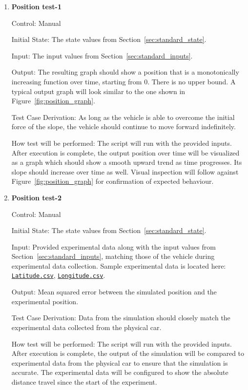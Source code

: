 \documentclass[12pt, titlepage]{article}
\newcommand{\refdata}[2]{
  \href{https://github.com/gr812b/CVT-Simulator/blob/main/experimental-data/#1
  }{\texttt{#2}}}
\begin{document}
\begin{enumerate}
  
  \item {} \hypertarget{PositionTest-1}{\textbf{Position test-1}} \label{PositionTest-1}
  
  Control: Manual
            
  Initial State: The state values from Section~\ref{sec:standard_state}.
  
  Input: The input values from Section~\ref{sec:standard_inputs}.
            
  Output: The resulting graph should show a position that is a monotonically increasing function over time, starting from 0. There is no upper bound. A typical output graph will look similar to the one shown in Figure~\ref{fig:position_graph}.
  
  Test Case Derivation: As long as the vehicle is able to overcome the initial force of the slope, the vehicle should continue to move forward indefinitely.
  
  How test will be performed: The script will run with the provided inputs. After execution is complete, the output position over time will be visualized as a graph which should show a smooth upward trend as time progresses. Its slope should increase over time as well. Visual inspection will follow against Figure~\ref{fig:position_graph} for confirmation of expected behaviour.
  
  \item {} \hypertarget{PositionTest-2}{\textbf{Position test-2}} \label{PositionTest-2}

  Control: Manual

  Initial State: The state values from Section~\ref{sec:standard_state}.
  
  Input: Provided experimental data along with the input values from Section~\ref{sec:standard_inputs}, matching those of the vehicle during experimental data collection. Sample experimental data is located here: \refdata{GPS\%20LATITUDE.csv}{Latitude.csv}, \refdata{GPS\%20LONGITUDE.csv}{Longitude.csv}.

  Output: Mean squared error between the simulated position and the experimental position.

  Test Case Derivation: Data from the simulation should closely match the experimental data collected from the physical car.

  How test will be performed: The script will run with the provided inputs. After execution is complete, the output of the simulation will be compared to experimental data from the physical car to ensure that the simulation is accurate. The experimental data will be configured to show the absolute distance travel since the start of the experiment.

\end{enumerate}
		
\end{document}
